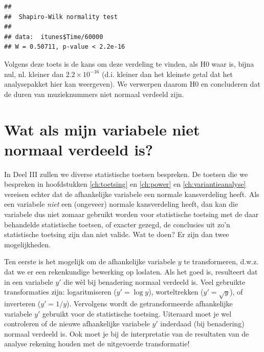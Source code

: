 \documentclass[
]{book}
\newenvironment{Shaded}{\begin{snugshade}}{\end{snugshade}}
\newcommand{\DecValTok}[1]{\textcolor[rgb]{0.00,0.00,0.81}{#1}}
\newcommand{\KeywordTok}[1]{\textcolor[rgb]{0.13,0.29,0.53}{\textbf{#1}}}
\newcommand{\NormalTok}[1]{#1}
\newcommand{\OperatorTok}[1]{\textcolor[rgb]{0.81,0.36,0.00}{\textbf{#1}}}
\begin{document}
\begin{Shaded}
\end{Shaded}

\begin{verbatim}
## 
##  Shapiro-Wilk normality test
## 
## data:  itunes$Time/60000
## W = 0.50711, p-value < 2.2e-16
\end{verbatim}

Volgens deze toets is de kans om deze verdeling te vinden, als H0 waar
is, bijna nul, nl. kleiner dan \(2.2 \times 10^{-16}\) (d.i. kleiner dan
het kleinste getal dat het analysepakket hier kan weergeven). We
verwerpen daarom H0 en concluderen dat de duren van muzieknummers niet
normaal verdeeld zijn.

\hypertarget{sec:watalsnietnormaal}{%
\section{Wat als mijn variabele niet normaal verdeeld is?}\label{sec:watalsnietnormaal}}

In Deel III zullen we diverse statistische
toetsen bespreken. De toetsen die we bespreken in hoofdstukken
\ref{ch:toetsing} en \ref{ch:power} en \ref{ch:variantieanalyse}
vereisen echter dat de afhankelijke
variabele een normale kansverdeling heeft. Als een variabele \emph{niet} een
(ongeveer) normale kansverdeling heeft, dan kan die variabele dus niet
zomaar gebruikt worden voor statistische toetsing met de daar behandelde
statistische toetsen, of exacter gezegd, de conclusies uit zo'n
statistische toetsing zijn dan niet valide. Wat te doen? Er zijn dan
twee mogelijkheden.

Ten eerste is het mogelijk om de afhankelijke variabele \(y\) te
transformeren, d.w.z. dat we er een rekenkundige bewerking op loslaten.
Als het goed is, resulteert dat in een variabele \(y'\) die wèl bij
benadering normaal verdeeld is. Veel gebruikte transformaties zijn:
logaritmiseren (\(y'=\log{y}\)), worteltrekken (\(y'=\sqrt{y}\)), of
inverteren (\(y'=1/y\)). Vervolgens wordt de getransformeerde
afhankelijke variabele \(y'\) gebruikt voor de statistische toetsing.
Uiteraard moet je wel controleren of de nieuwe afhankelijke variabele
\(y'\) inderdaad (bij benadering) normaal verdeeld is. Ook moet je bij de
interpretatie van de resultaten van de analyse rekening houden met de
uitgevoerde transformatie!
\end{document}
